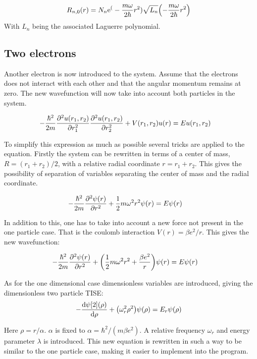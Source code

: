 \begin{align*}
	R_{n,0}(r)=N_n\mathrm{e}^{(}-\frac{m\omega}{2\hbar}r^2)\sqrt{L_{n}}\qty(-\frac{m\omega}{2\hbar}r^2)
\end{align*}
With $L_n$ being the associated Laguerre polynomial.


\subsection*{Two electrons}

Another electron is now introduced to the system. Assume that the electrons does not interact with each other and that the angular momentum remains at zero. The new wavefunction will now take into account both particles in the system.

\begin{align}
	-&\frac{\hbar^2}{2m}\pdv[2]{u(r_1,r_2)}{r_1}\pdv[2]{u(r_1,r_2)}{r_2}+V(r_1,r_2)u(r)=Eu(r_1,r_2)
\end{align}

To simplify this expression as much as possible several tricks are applied to the equation. Firstly the system can be rewritten in terms of a center of mass, $R=(r_1+r_2)/2$, with a relative radial coordinate $r=r_1+r_2$. This gives the possibility of separation of variables separating the center of mass and the radial coordinate.  

\begin{align}
	-&\frac{\hbar^2}{2m}\pdv[2]{\psi(r)}{r}+\frac{1}{2}m\omega^2r^2\psi(r)=E\psi(r)
\end{align}

In addition to this, one has to take into account a new force not present in the one particle case. That is the coulomb interaction $V(r)=\beta e^2/r$. This gives the new wavefunction:

\begin{align}
-&\frac{\hbar^2}{2m}\pdv[2]{\psi(r)}{r}+\qty(\frac{1}{2}m\omega^2r^2+\frac{\beta e^2}{r})\psi(r)=E\psi(r)
\end{align}

As for the one dimensional case dimensionless variables are introduced, giving the dimensionless two particle TISE:
\begin{align}
	-\dv{\psi[2](\rho)}{\rho}+\qty(\omega_r^2\rho^2)\psi(\rho)=E_r\psi(\rho)
\end{align}

Here $\rho=r/\alpha$. $\alpha$ is fixed to $\alpha=\hbar^2/(m\beta e^2)$. A relative frequency $\omega_r$ and energy parameter $\lambda$ is introduced. This new equation is rewritten in such a way to be similar to the one particle case, making it easier to implement into the program.






